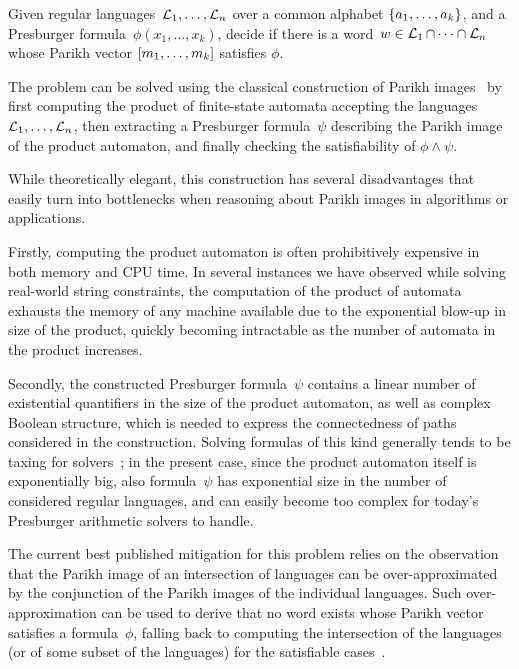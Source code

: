 {
    \centering
    \begin{tcolorbox}[colback=gray!5!white,colframe=gray!75!black,%
        title=Joint satisfiability of Parikh images modulo Presburger constraints,%
        width=0.9\linewidth]
        Given regular languages~$\operatorname{\mathcal{L}}_1, \ldots, \operatorname{\mathcal{L}}_n$
        over a common alphabet $\left\{a_1, \ldots, a_k\right\}$,
        and a Presburger formula~$\phi(x_1, \ldots, x_k)$, 
        decide if there is a word~$w \in \operatorname{\mathcal{L}}_1 \cap
        \cdots \cap \operatorname{\mathcal{L}}_n$ whose Parikh vector 
        $\left[{m_1, \ldots, m_k}\right]$ satisfies $\phi$.
    \end{tcolorbox}
}

The problem can be solved using the classical construction of Parikh
images~\cite{muscholl-linear,generate-parikh-image} by first computing
the product of finite-state automata accepting the
languages~$\operatorname{\mathcal{L}}_1, \ldots, \operatorname{\mathcal{L}}_n$, then extracting a
Presburger formula~$\psi$ describing the Parikh image of the product
automaton, and finally checking the satisfiability of $\phi \wedge \psi$.
  
While theoretically elegant, this construction has several
disadvantages that easily turn into bottlenecks when reasoning about
Parikh images in algorithms or applications.

Firstly, computing the product automaton is often prohibitively
expensive in both memory and CPU time.  In several instances we have
observed while solving real-world string constraints, the computation
of the product of automata exhausts the memory of any machine
available due to the exponential blow-up in size of the product,
quickly becoming intractable as the number of automata in the product
increases.

Secondly, the constructed Presburger formula~$\psi$ contains a linear
number of existential quantifiers in the size of the product
automaton, as well as complex Boolean structure, which is needed to
express the connectedness of paths considered in the construction.
Solving formulas of this kind generally tends to be taxing for
solvers~\cite{ostrich-plus}; in the present case, since the product
automaton itself is exponentially big, also formula~$\psi$ has
exponential size in the number of considered regular languages, and
can easily become too complex for today's Presburger arithmetic
solvers to handle.
  
The current best published mitigation for this problem relies on the
observation that the Parikh image of an intersection of languages can
be over-approximated by the conjunction of the Parikh images of the
individual languages. Such over-approximation can be used to derive
that no word exists whose Parikh vector satisfies a formula~$\phi$,
falling back to computing the intersection of the languages (or of
some subset of the languages) for the satisfiable
cases~\cite{approximate-parikh}.

